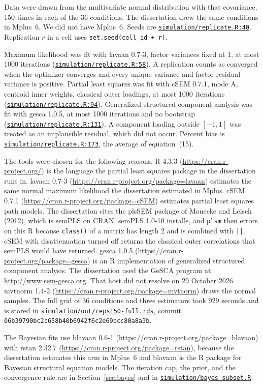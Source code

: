 \documentclass[11pt]{article}
\newcommand{\codebase}{https://github.com/alectionary/vibe-math/blob/master/formalization/chumney-sem-small-samples}
\newcommand{\code}[2]{\href{\codebase/#1\#L#2}{\texttt{#1:#2}}}
\newcommand{\filelink}[1]{\href{\codebase/#1}{\texttt{#1}}}
\gdef\linkbayes{\href{https://github.com/alectionary/vibe-math/blob/master/formalization/chumney-sem-small-samples/simulation/bayes_subset.R}{\texttt{simulation/bayes_subset.R}}}
\begin{document}
Data were drawn from the multivariate normal distribution with that
covariance, 150 times in each of the 36 conditions. The dissertation drew
the same conditions in Mplus~6. We did not have Mplus~6. Seeds are
\code{simulation/replicate.R}{40}. Replication $r$ in a cell uses
\texttt{set.seed(cell\_id + r)}.

Maximum likelihood was fit with lavaan 0.7-3, factor variances fixed at 1,
at most 1000 iterations
(\code{simulation/replicate.R}{58}).
A replication counts as converged when the optimizer converges and every
unique variance and factor residual variance is positive. Partial least
squares was fit with cSEM 0.7.1, mode A, centroid inner weights, classical
outer loadings, at most 1000 iterations
(\code{simulation/replicate.R}{94}).
Generalized structured component analysis was fit with gesca 1.0.5, at most
1000 iterations and no bootstrap
(\code{simulation/replicate.R}{131}).
A component loading outside $[-1, 1]$ was treated as an implausible
residual, which did not occur. Percent bias is
\code{simulation/replicate.R}{173}, the average of equation~(15).

The tools were chosen for the following reasons. R 4.3.3
(\url{https://cran.r-project.org/}) is the language the partial least
squares package in the dissertation runs in. lavaan 0.7-3
(\url{https://cran.r-project.org/package=lavaan}) estimates the same normal
maximum likelihood the dissertation estimated in Mplus. cSEM 0.7.1
(\url{https://cran.r-project.org/package=cSEM}) estimates partial least
squares path models. The dissertation cites the plsSEM package of Monecke
and Leisch (2012), which is semPLS on CRAN. semPLS 1.0-10 installs, and
\texttt{plsm} then errors on this R because \texttt{class()} of a matrix
has length 2 and is combined with \texttt{||}. cSEM with disattenuation
turned off returns the classical outer correlations that semPLS would have
returned. gesca 1.0.5
(\url{https://cran.r-project.org/package=gesca}) is an R implementation of
generalized structured component analysis. The dissertation used the GeSCA
program at \url{http://www.sem-gesca.org}. That host did not resolve on
29 October 2026. mvtnorm 1.4-2
(\url{https://cran.r-project.org/package=mvtnorm}) draws the normal samples.
The full grid of 36 conditions and three estimators took 929 seconds and is
stored in \filelink{simulation/out/reps150-full.rds}, commit
\texttt{06b39790bc2c658b40b6942f6c2e69bcc80a8a3b}.

The Bayesian fits use blavaan 0.6-1
(\url{https://cran.r-project.org/package=blavaan}) with rstan 2.32.7
(\url{https://cran.r-project.org/package=rstan}), because the dissertation
estimates this arm in Mplus~6 and blavaan is the R package for Bayesian
structural equation models. The iteration cap, the prior, and the
convergence rule are in Section~\ref{sec:bayes} and in
\linkbayes.
\end{document}
